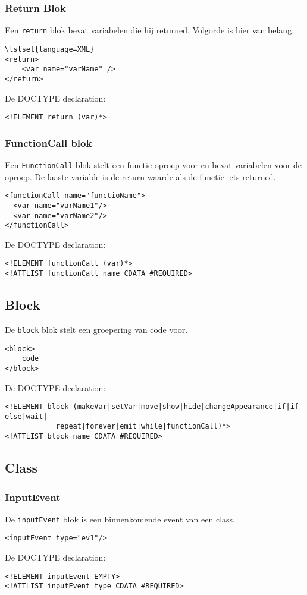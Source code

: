 \documentclass[]{article}
\begin{document}
\subsubsection{Return Blok}
Een \texttt{return} blok bevat variabelen die hij returned. Volgorde is hier van belang.
\begin{lstlisting}
\lstset{language=XML}
<return>
	<var name="varName" />
</return>	
\end{lstlisting}
De DOCTYPE declaration: 
\lstset{language=XML}
\begin{lstlisting}
<!ELEMENT return (var)*>
\end{lstlisting}
\subsubsection{FunctionCall blok}
Een \texttt{FunctionCall} blok stelt een functie oproep voor en bevat variabelen voor de oproep.
De laaste variable is de return waarde als de functie iets returned.
\lstset{language=XML}
\begin{lstlisting}
<functionCall name="functioName">
  <var name="varName1"/>
  <var name="varName2"/>
</functionCall>
\end{lstlisting}
De DOCTYPE declaration: 
\lstset{language=XML}
\begin{lstlisting}
<!ELEMENT functionCall (var)*>
<!ATTLIST functionCall name CDATA #REQUIRED>
\end{lstlisting}

\subsection{Block}
De \texttt{block} blok stelt een groepering van code voor. 
\lstset{language=XML}
\begin{lstlisting}
<block>
	code
</block>
\end{lstlisting}
De DOCTYPE declaration: 
\lstset{language=XML}
\begin{lstlisting}
<!ELEMENT block (makeVar|setVar|move|show|hide|changeAppearance|if|if-else|wait|
			repeat|forever|emit|while|functionCall)*>
<!ATTLIST block name CDATA #REQUIRED>
\end{lstlisting}

\subsection{Class}
\subsubsection{InputEvent}
De \texttt{inputEvent} blok is een binnenkomende event van een class.
\lstset{language=XML}
\begin{lstlisting}
<inputEvent type="ev1"/>
\end{lstlisting}
De DOCTYPE declaration: 
\lstset{language=XML}
\begin{lstlisting}
<!ELEMENT inputEvent EMPTY>
<!ATTLIST inputEvent type CDATA #REQUIRED>
\end{lstlisting}
\end{document}
